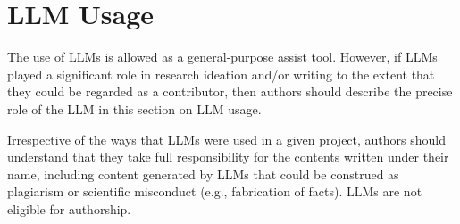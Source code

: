 \documentclass{article}
\begin{document}
\section*{LLM Usage}
The use of LLMs is allowed as a general-purpose assist tool. However,  if LLMs played a significant role in research ideation and/or writing to the extent that they could be regarded as a contributor, then authors should describe the precise role of the LLM in this section on LLM usage. 

Irrespective of the ways that LLMs were used in a given project, authors should understand that they take full responsibility for the contents written under their name, including content generated by LLMs that could be construed as plagiarism or scientific misconduct (e.g., fabrication of facts).  LLMs are not eligible for authorship.




% 
% 
\end{document}
